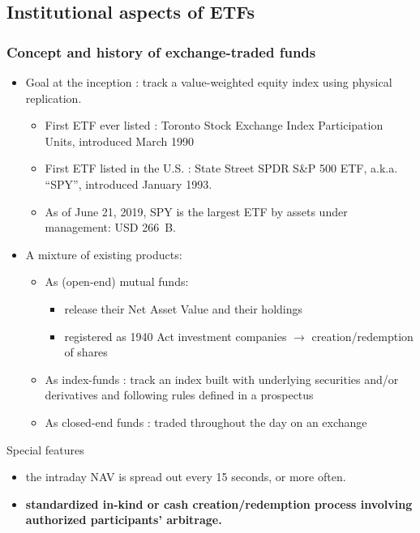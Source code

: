 \documentclass[9pt, usenames, dvipsnames]{beamer}
\begin{document}
\subsection{Institutional aspects of ETFs}

\begin{frame}
  \frametitle{Concept and history of exchange-traded funds}
  \begin{itemize}
  \item<1-> Goal at the inception : track a value-weighted equity index using physical replication.
    \begin{itemize}
    \item First ETF ever listed : Toronto Stock Exchange Index Participation Units, introduced March 1990
    \item First ETF listed in the U.S. : State Street SPDR S\&P 500 ETF, a.k.a. ``SPY'', introduced January 1993.
    \item As of June 21, 2019, SPY is the largest ETF by assets under management: USD 266~B.
    \end{itemize}
  \item<2-> A mixture of existing products:
    \begin{itemize}
    \item As (open-end) mutual funds:
      \begin{itemize}
      \item release their Net Asset Value and their holdings
      \item registered as 1940 Act investment companies $\rightarrow$ creation/redemption of shares
      \end{itemize}
    \item As index-funds : track an index built with underlying
      securities and/or derivatives and following rules defined in a
      prospectus
    \item As closed-end funds : traded throughout the day on an
      exchange
    \end{itemize}
  \end{itemize}
  \begin{alertblock}{Special features}
    \begin{itemize}
    \item the intraday NAV is spread out every 15 seconds, or more often.
    \item \textbf{standardized in-kind or cash creation/redemption process involving authorized participants' arbitrage.}
    \end{itemize}
  \end{alertblock}
\end{frame}
\end{document}
